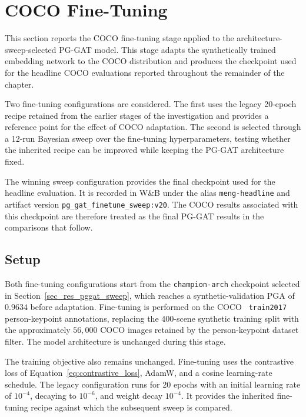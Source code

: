 \section{COCO Fine-Tuning}
\label{sec_res_coco_ft}

This section reports the COCO fine-tuning stage applied to the
architecture-sweep-selected PG-GAT model.
This stage adapts the synthetically trained embedding network
to the COCO distribution
and produces the checkpoint used for the headline COCO evaluations
reported throughout the remainder of the chapter.

Two fine-tuning configurations are considered.
The first uses the legacy 20-epoch recipe retained from the earlier
stages of the investigation
and provides a reference point for the effect of COCO adaptation.
The second is selected through a 12-run Bayesian sweep over the
fine-tuning hyperparameters,
testing whether the inherited recipe can be improved while keeping
the PG-GAT architecture fixed.

The winning sweep configuration provides the final checkpoint used for
the headline evaluation.
It is recorded in W\&B under the alias \texttt{meng-headline}
and artifact version \texttt{pg\_gat\_finetune\_sweep:v20}.
The COCO results associated with this checkpoint are therefore treated
as the final PG-GAT results in the comparisons that follow.

\subsection{Setup}
\label{sec_res_coco_ft_setup}

Both fine-tuning configurations start from the
\texttt{champion-arch} checkpoint selected in
Section~\ref{sec_res_pggat_sweep},
which reaches a synthetic-validation PGA of $0.9634$ before adaptation.
Fine-tuning is performed on the COCO~\cite{lin2014coco}
\texttt{train2017} person-keypoint annotations,
replacing the 400-scene synthetic training split
with the approximately $56{,}000$ COCO images retained by the
person-keypoint dataset filter.
The model architecture is unchanged during this stage.

The training objective also remains unchanged.
Fine-tuning uses the contrastive loss of
Equation~\eqref{eq:contrastive_loss},
AdamW,
and a cosine learning-rate schedule.
The legacy configuration runs for 20 epochs with an initial learning rate
of $10^{-4}$,
decaying to $10^{-6}$,
and weight decay $10^{-4}$.
It provides the inherited fine-tuning recipe against which the subsequent
sweep is compared.

